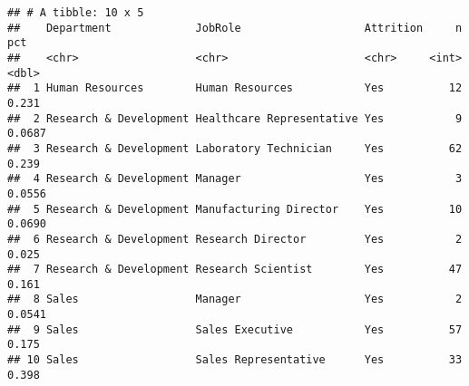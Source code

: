 \documentclass[
]{article}
\newenvironment{Shaded}{\begin{snugshade}}{\end{snugshade}}
\newcommand{\CommentTok}[1]{\textcolor[rgb]{0.56,0.35,0.01}{\textit{#1}}}
\newcommand{\DataTypeTok}[1]{\textcolor[rgb]{0.13,0.29,0.53}{#1}}
\newcommand{\FloatTok}[1]{\textcolor[rgb]{0.00,0.00,0.81}{#1}}
\newcommand{\KeywordTok}[1]{\textcolor[rgb]{0.13,0.29,0.53}{\textbf{#1}}}
\newcommand{\NormalTok}[1]{#1}
\newcommand{\OperatorTok}[1]{\textcolor[rgb]{0.81,0.36,0.00}{\textbf{#1}}}
\newcommand{\OtherTok}[1]{\textcolor[rgb]{0.56,0.35,0.01}{#1}}
\newcommand{\StringTok}[1]{\textcolor[rgb]{0.31,0.60,0.02}{#1}}
\begin{document}
\begin{verbatim}
## # A tibble: 10 x 5
##    Department             JobRole                   Attrition     n    pct
##    <chr>                  <chr>                     <chr>     <int>  <dbl>
##  1 Human Resources        Human Resources           Yes          12 0.231 
##  2 Research & Development Healthcare Representative Yes           9 0.0687
##  3 Research & Development Laboratory Technician     Yes          62 0.239 
##  4 Research & Development Manager                   Yes           3 0.0556
##  5 Research & Development Manufacturing Director    Yes          10 0.0690
##  6 Research & Development Research Director         Yes           2 0.025 
##  7 Research & Development Research Scientist        Yes          47 0.161 
##  8 Sales                  Manager                   Yes           2 0.0541
##  9 Sales                  Sales Executive           Yes          57 0.175 
## 10 Sales                  Sales Representative      Yes          33 0.398
\end{verbatim}

\begin{Shaded}
\end{Shaded}
\end{document}
